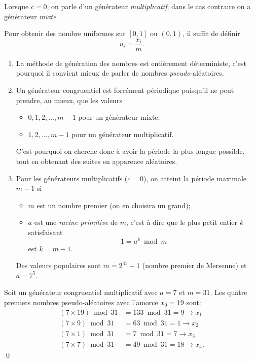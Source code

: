Lorsque $c = 0$, on parle d'un générateur \emph{multiplicatif}; dans
le cas contraire on a générateur \emph{mixte}.

Pour obtenir des nombre uniformes sur $[0, 1]$ ou $(0, 1)$, il suffit
de définir
\begin{equation*}
  u_i = \frac{x_i}{m}.
\end{equation*}

\begin{rems}
  \begin{enumerate}
  \item La méthode de génération des nombres est entièrement
    déterministe, c'est pourquoi il convient mieux de parler de
    nombres \emph{pseudo}-aléatoires.
  \item Un générateur congruentiel est forcément périodique puisqu'il
    ne peut prendre, au mieux, que les valeurs
    \begin{itemize}
    \item $0, 1, 2, \dots, m - 1$ pour un générateur mixte;
    \item $1, 2, \dots, m - 1$ pour un générateur multiplicatif.
    \end{itemize}
    C'est pourquoi on cherche donc à avoir la période la plus longue
    possible, tout en obtenant des suites en apparence aléatoires.
  \item Pour les générateurs multiplicatifs ($c = 0$), on atteint la
    période maximale $m - 1$ si
    \begin{itemize}
    \item $m$ est un nombre premier (on en choisira un grand);
    \item $a$ est une \emph{racine primitive} de $m$, c'est à dire que
      le plus petit entier $k$ satisfaisant
      \begin{equation*}
        1 = a^k \bmod m
      \end{equation*}
      est $k = m - 1$.
    \end{itemize}
    Des valeurs populaires sont $m = 2^{31} - 1$ (nombre premier de
    Mersenne) et $a = 7^5$.
  \end{enumerate}
\end{rems}

\begin{exemple}
  Soit un générateur congruentiel multiplicatif avec $a = 7$ et $m =
  31$. Les quatre premiers nombres pseudo-aléatoires avec l'amorce
  $x_0 = 19$ sont:
  \begin{align*}
    (7 \times 19) \bmod 31 &= 133 \bmod 31 = 9 \rightarrow x_1 \\
    (7 \times 9) \bmod 31 &= 63 \bmod 31 = 1 \rightarrow x_2 \\
    (7 \times 1) \bmod 31 &= 7 \bmod 31 = 7 \rightarrow x_3 \\
    (7 \times 7) \bmod 31 &= 49 \bmod 31 = 18 \rightarrow x_4.
  \end{align*}
  \qed
\end{exemple}

